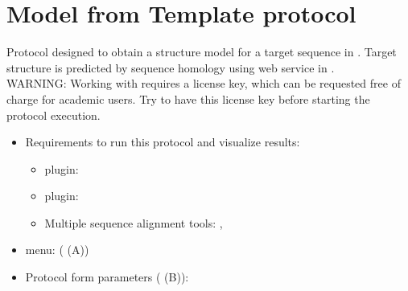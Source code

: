 \section{Model from Template protocol}
\label{app:modelFromTemplate}%
Protocol designed to obtain a structure model for a target sequence in \scipion. Target structure is predicted by sequence homology using \modeller \citep{sali1993} web service in \chimera.\\
WARNING: Working with \modeller requires a license key, which can be requested free of charge for academic users. Try to have this license key before starting the protocol execution. 

   
 \begin{itemize}
  \item Requirements to run this protocol and visualize results:
            \begin{itemize}
                \item \scipion plugin: 
                \item \scipion plugin: 
                \item Multiple sequence alignment tools: , 
            \end{itemize}
  \item \scipion menu:
             ( (A))
  
  \item Protocol form parameters ( (B)):
  

\end{itemize}
